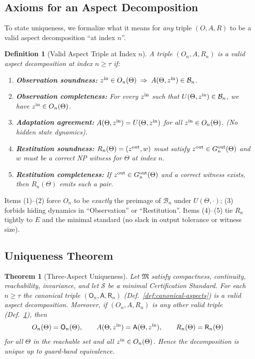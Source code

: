 \documentclass[12pt]{article}
\newtheorem{definition}{Definition}[section]
\newtheorem{theorem}{Theorem}[section]
\begin{document}
\subsection*{Axioms for an Aspect Decomposition}

To state uniqueness, we formalize what it means for \emph{any} triple $(O,A,R)$ to be a valid aspect decomposition “at index $n$”.

\begin{definition}[Valid Aspect Triple at Index $n$]\label{def:valid-triple}
A triple $(O_n,A,R_n)$ is a \emph{valid aspect decomposition} at index $n\ge\tau$ if:
\begin{enumerate}
  \item \textbf{Observation soundness:}
        $z^{\rm in}\in O_n(\Theta)\;\Rightarrow\;A(\Theta,z^{\rm in})\in\mathcal B_n$.
  \item \textbf{Observation completeness:}
        For every $z^{\rm in}$ such that $U(\Theta,z^{\rm in})\in\mathcal B_n$, we have $z^{\rm in}\in O_n(\Theta)$.
  \item \textbf{Adaptation agreement:}
        $A(\Theta,z^{\rm in}) = U(\Theta,z^{\rm in})$ for all $z^{\rm in}\in O_n(\Theta)$.  (No hidden state dynamics).
  \item \textbf{Restitution soundness:}
        $R_n(\Theta)=(z^{\rm out},w)$ must satisfy $z^{\rm out}\in G^{\rm out}_n(\Theta)$ and $w$ must be a correct NP witness for $\Theta$ at index $n$.
  \item \textbf{Restitution completeness:}
        If $z^{\rm out}\in G^{\rm out}_n(\Theta)$ and a correct witness exists, then $R_n(\Theta)$ emits such a pair. 
\end{enumerate}
\end{definition}

Items (1)–(2) force $O_n$ to be \emph{exactly} the preimage of $\mathcal B_n$ under $U(\Theta,\cdot)$; (3) forbids hiding dynamics in “Observation” or “Restitution”.  Items (4)–(5) tie $R_n$ tightly to $E$ and the minimal standard (no slack in output tolerance or witness size).

\subsection*{Uniqueness Theorem}

\begin{theorem}[Three‑Aspect Uniqueness]\label{thm:aspect-uniqueness}
Let $\mathfrak M$ satisfy compactness, continuity, reachability, invariance, and let $\mathcal S$ be a minimal Certification Standard.  For each $n\ge\tau$ the canonical triple $(\mathsf O_n,\mathsf A,\mathsf R_n)$ (Def.~\ref{def:canonical-aspects}) is a valid aspect decomposition.  Moreover, if $(O_n,A,R_n)$ is any other valid triple (Def.~\ref{def:valid-triple}), then
\[
  O_n(\Theta) = \mathsf O_n(\Theta),\qquad
  A(\Theta,z^{\rm in}) = \mathsf A(\Theta,z^{\rm in}),\qquad
  R_n(\Theta)=\mathsf R_n(\Theta)
\]
for all $\Theta$ in the reachable set and all $z^{\rm in}\in O_n(\Theta)$.  Hence the decomposition is unique up to guard‑band equivalence.
\end{theorem}
\end{document}
